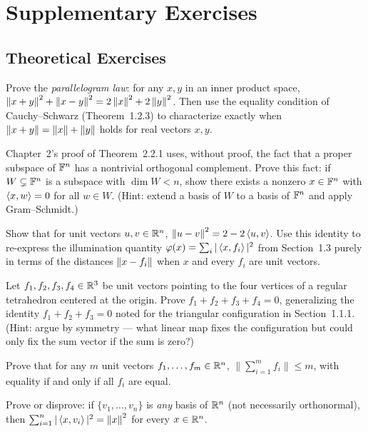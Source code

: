 \section{Supplementary Exercises}
\subsection*{Theoretical Exercises}
\begin{theoexercises}
	\item Prove the \emph{parallelogram law}: for any $x,y$ in an inner
	product space, $\left\| x+y \right\|^2+\left\| x-y \right\|^2=2\left\| x \right\|^2+2\left\| y \right\|^2$.
	Then use the equality condition of Cauchy--Schwarz (Theorem~1.2.3)
	to characterize exactly when $\left\| x+y \right\|=\left\| x \right\|+\left\| y \right\|$ holds
	for real vectors $x,y$.
	
	\item Chapter~2's proof of Theorem~2.2.1 uses, without proof, the fact
	that a proper subspace of $\mathbb{F}^n$ has a nontrivial orthogonal
	complement. Prove this fact: if $W\subsetneq\mathbb{F}^n$ is a subspace
	with $\dim W<n$, show there exists a nonzero $x\in\mathbb{F}^n$ with
	$\left\langle x, w \right\rangle=0$ for all $w\in W$. (Hint: extend a basis of $W$ to
	a basis of $\mathbb{F}^n$ and apply Gram--Schmidt.)
	
	\item Show that for unit vectors $u,v\in\mathbb{R}^n$,
	$\left\| u-v \right\|^2=2-2\left\langle u, v \right\rangle$. Use this identity to re-express
	the illumination quantity $\varphi(x)=\sum_i|\left\langle x, f_i \right\rangle|^2$
	from Section~1.3 purely in terms of the distances $\left\| x-f_i \right\|$
	when $x$ and every $f_i$ are unit vectors.
	
	\item Let $f_1,f_2,f_3,f_4\in\mathbb{R}^3$ be unit vectors pointing to the four
	vertices of a regular tetrahedron centered at the origin. Prove
	$f_1+f_2+f_3+f_4=0$, generalizing the identity
	$f_1+f_2+f_3=0$ noted for the triangular configuration in
	Section~1.1.1. (Hint: argue by symmetry --- what linear map fixes
	the configuration but could only fix the sum vector if the sum is
	zero?)
	
	\item Prove that for any $m$ unit vectors $f_1,\ldots,f_m\in\mathbb{R}^n$,
	$\bigl\|\sum_{i=1}^m f_i\bigr\|\le m$, with equality if and only if
	all $f_i$ are equal.
	
	\item Prove or disprove: if $\{v_1,\ldots,v_n\}$ is \emph{any} basis of
	$\mathbb{R}^n$ (not necessarily orthonormal), then
	$\sum_{i=1}^n|\left\langle x, v_i \right\rangle|^2=\left\| x \right\|^2$ for every $x\in\mathbb{R}^n$.
\end{theoexercises}

